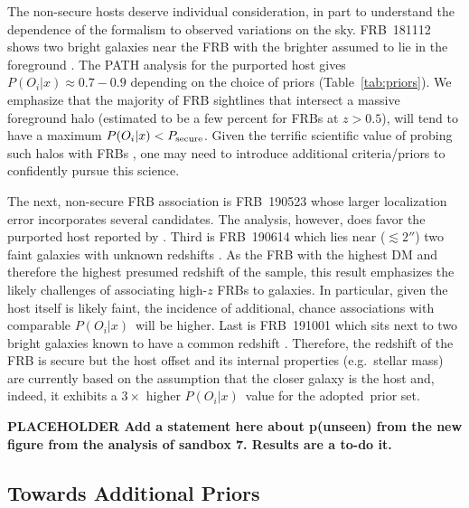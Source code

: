 \documentclass[twocolumn,linenumbers]{aastex63}
\newcommand{\adopted}{adopted}
\newcommand{\mPOix}{P(O_i|x)}  %
\newcommand{\POix}{$\mPOix$}
\newcommand{\mPOsec}{P_{\rm secure}}  %
\begin{document}
The non-secure hosts
deserve individual consideration,
in part to understand the dependence of the formalism
to observed variations on the sky.
FRB~181112 shows two bright galaxies near the FRB with the
brighter assumed to lie in the foreground
\citep{Prochaska19b}.  
The PATH analysis for 
the purported host gives $\mPOix \approx 0.7-0.9$
depending on the choice of priors (Table~\ref{tab:priors}).
We emphasize that the majority of FRB sightlines that
intersect a massive foreground halo (estimated to 
be a few percent for FRBs at $z>0.5$), will tend to 
have a maximum $\mPOix < \mPOsec$.  
Given the terrific scientific value of probing such
halos with FRBs \citep{Prochaska19b}, one may need
to introduce additional criteria/priors to confidently
pursue this science.

The next, non-secure FRB association is FRB~190523
whose larger localization error incorporates several
candidates. 
The analysis, however, does favor the purported host
reported by \cite{Ravi19}.
Third is FRB~190614 which lies near ($\lesssim 2''$) two 
faint galaxies with unknown redshifts \citep{Law20}.
As the FRB with the highest DM and therefore the highest
presumed redshift of the sample, this result emphasizes
the likely challenges of associating high-$z$ FRBs
to galaxies.  In particular, given the host itself is
likely faint, the incidence of additional, chance
associations with comparable \POix\ will be higher.
Last is FRB~191001 which sits next to two bright galaxies
known to have a common redshift \citep{Bhandari20b}.
Therefore, 
the redshift of the FRB is secure but the
host offset and its internal properties (e.g.\ stellar
mass) are currently based on the assumption that the
closer galaxy is the host 
and, indeed, it exhibits a $3\times$ higher \POix\ value
for the \adopted\ prior set.

{\bf PLACEHOLDER Add a statement here about p(unseen) from the new figure from the analysis of sandbox 7. Results are a to-do it.}


\subsection{Towards Additional Priors}
\label{sec:add_priors}
\end{document}
